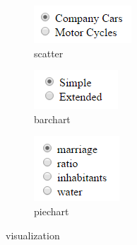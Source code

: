 \documentclass[a4paper,twoside,11pt]{article}
\begin{document}
\begin{figure}
        \centering
        \begin{subfigure}[h]{0.12\textwidth}
                \includegraphics[width=\textwidth]{Interface/ScatterInterface.png}
                \caption{scatter}
        \end{subfigure}
        \begin{subfigure}[h]{0.12\textwidth}
                \includegraphics[width=\textwidth]{Interface/BarInterface.png}
                \caption{barchart}
        \end{subfigure}
        \begin{subfigure}[h]{0.12\textwidth}
                \includegraphics[width=\textwidth]{Interface/PieInterface.png}
                \caption{piechart}
        \end{subfigure}
        \caption{visualization}
\end{figure}
\end{document}

